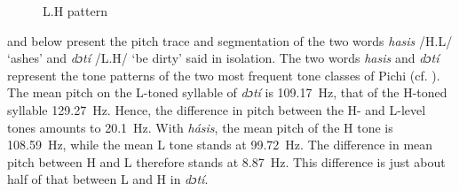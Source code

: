 \begin{figure}
\caption{L.H pattern}
\label{fig:key:3.6}  
\end{figure}

 and  below present the pitch trace and segmentation of the two words \textit{hasis} /H.L/ ‘ashes’ and \textit{dɔtí} /L.H/ ‘be dirty’ said in isolation. The two words \textit{hasis} and \textit{dɔtí} represent the tone patterns of the two most frequent tone classes of Pichi (cf. ). The mean pitch on the L-toned syllable of \textit{dɔtí} is 109.17~Hz, that of the H-toned syllable 129.27~Hz. Hence, the difference in pitch between the H- and L-level tones amounts to 20.1~Hz. With \textit{hásis}, the mean pitch of the H tone is 108.59~Hz, while the mean L tone stands at 99.72~Hz. The difference in mean pitch between H and L therefore stands at 8.87~Hz. This difference is just about half of that between L and H in \textit{dɔtí}.

